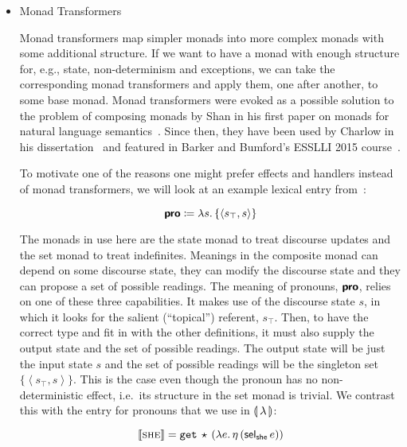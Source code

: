 \begin{itemize}
 
\item Monad
  Transformers~\cite{charlow2014semantics,barker2015monads}

  Monad transformers map simpler monads into more complex monads with some
  additional structure. If we want to have a monad with enough structure
  for, e.g., state, non-determinism and exceptions, we can take the
  corresponding monad transformers and apply them, one after another, to
  some base monad. Monad transformers were evoked as a possible solution to
  the problem of composing monads by Shan in his first paper on monads for
  natural language semantics~\cite{shan2002monads}. Since then, they have
  been used by Charlow in his dissertation~\cite{charlow2014semantics} and
  featured in Barker and Bumford's ESSLLI 2015
  course~\cite{barker2015monads}.

  To motivate one of the reasons one might prefer effects and handlers
  instead of monad transformers, we will look at an example lexical entry
  from~\cite{charlow2014semantics}:

  $$
  \textsf{\textbf{pro}} \coloneqq \lambda s.\, \{ \left< s_\top, s \right> \}
  $$

  The monads in use here are the state monad to treat discourse updates and
  the set monad to treat indefinites. Meanings in the composite monad can
  depend on some discourse state, they can modify the discourse state and
  they can propose a set of possible readings. The meaning of pronouns,
  $\textsf{\textbf{pro}}$, relies on one of these three capabilities. It
  makes use of the discourse state $s$, in which it looks for the salient
  (``topical'') referent, $s_\top$. Then, to have the correct type and fit
  in with the other definitions, it must also supply the output state and
  the set of possible readings. The output state will be just the input
  state $s$ and the set of possible readings will be the singleton set
  $\{\left< s_\top, s \right>\}$. This is the case even though the pronoun
  has no non-deterministic effect, i.e.\ its structure in the set monad is
  trivial. We contrast this with the entry for pronouns that we use in
  ${\llparenthesis \, \lambda \, \rrparenthesis}$:

  $$
  \llbracket \textsc{she} \rrbracket = \mathtt{get}\,\star\,(\lambda e.\, \eta\,(\textsf{sel}_{\textsf{she}}\,e))
  $$


\end{itemize}
